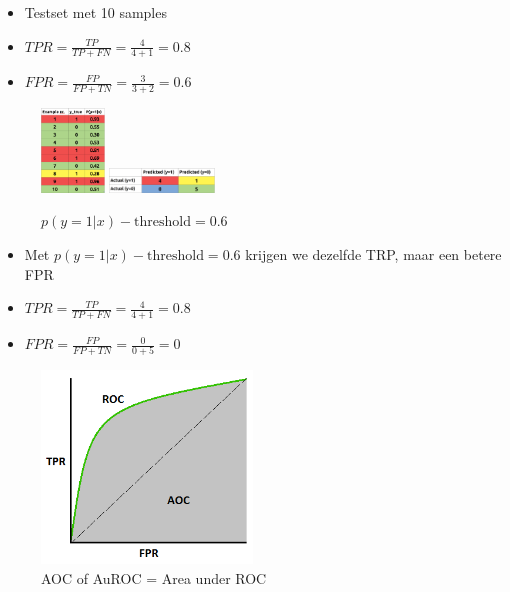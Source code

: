 \documentclass{article}
\begin{document}
\begin{itemize}
    \item Testset met 10 samples
    \item $TPR = \frac{TP}{TP + FN} = \frac{4}{4 + 1} = 0.8$
    \item $FPR = \frac{FP}{FP + TN} = \frac{3}{3 + 2} = 0.6$
\end{itemize}

\begin{figure}[H]
    \centering
    \includegraphics[width=0.15\textwidth]{roc-treshold3.png}
    \includegraphics[width=0.25\textwidth]{roc-treshold4.png}
    \caption{$p(y=1 | x) - \text{threshold} = 0.6$ }
\end{figure}

\begin{itemize}
    \item Met $p(y=1 | x) - \text{threshold} = 0.6$ krijgen we dezelfde TRP, maar een betere FPR
    \item $TPR = \frac{TP}{TP + FN} = \frac{4}{4 + 1} = 0.8$
    \item $FPR = \frac{FP}{FP + TN} = \frac{0}{0 + 5} = 0$
\end{itemize}

\begin{figure}[H]
    \centering
    \includegraphics[width=0.5\textwidth]{AuROC.png}
    \caption{AOC of AuROC = Area under ROC}
\end{figure}
\end{document}
